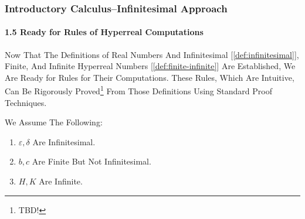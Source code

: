 \begin{frame}
\frametitle{Introductory Calculus--Infinitesimal Approach}
\framesubtitle{1.5 Ready for Rules of Hyperreal Computations}
\label{slide:1.5-14}
Now That The Definitions of Real Numbers And Infinitesimal [\ref{def:infinitesimal}], Finite, And Infinite Hyperreal Numbers [\ref{def:finite-infinite}] Are Established, We Are Ready for Rules for Their Computations. These Rules, Which Are Intuitive, Can Be Rigorously Proved{\footnote{\alert{TBD!}}} From Those Definitions Using Standard Proof Techniques.
\begin{definition}
We Assume The Following:
\begin{enumerate}
\item \alert{$\varepsilon,\delta$ Are Infinitesimal}.
\item \alert{$b,c$ Are Finite But Not Infinitesimal}.
\item \alert{$H,K$ Are Infinite}.
\end{enumerate}
\end{definition}
\end{frame}
